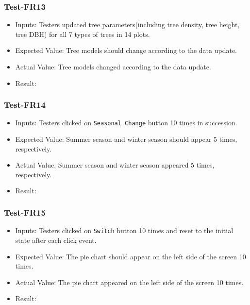 \documentclass[12pt, titlepage]{article}
\begin{document}
\subsubsection{Test-FR13}
\begin{itemize}
\item Inputs: Testers updated tree parameters(including 
tree density, tree height, tree DBH) for all 7 types of trees 
in 14 plots.
\item Expected Value: Tree models should change according to the 
data update.
\item Actual Value: Tree models changed according to the data update.
\item Result: \pass
\end{itemize}

\subsubsection{Test-FR14}
\begin{itemize}
\item Inputs: Testers clicked on \verb|Seasonal Change| button 
10 times in succession.
\item Expected Value: Summer season and winter season should appear
5 times, respectively.
\item Actual Value:  Summer season and winter season appeared
5 times, respectively.
\item Result: \pass
\end{itemize}

\subsubsection{Test-FR15}
\begin{itemize}
\item Inputs: Testers clicked on \verb|Switch| button 10 times and 
reset to the initial state after each click event. 
\item Expected Value: The pie chart should appear on the left
side of the screen 10 times.
\item Actual Value:  The pie chart appeared on the left
side of the screen 10 times.
\item Result: \pass
\end{itemize}
\end{document}
